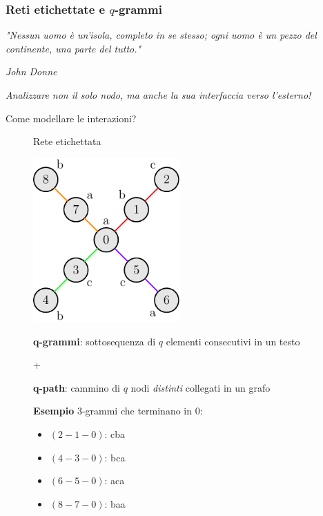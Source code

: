\begin{frame}
	\frametitle{Reti etichettate e $q$-grammi}
	
	\textit{"Nessun uomo è un'isola, completo in se stesso; ogni uomo è un pezzo del continente, una parte del tutto."}
	\begin{flushright}
		\small \textit{John Donne}
	\end{flushright}
	
	\centering
	\textit{Analizzare non il solo nodo, ma anche la sua interfaccia verso l'esterno!}\\
	
	\pause
	
	Come modellare le interazioni?\\
	
	\pause
	
	\begin{figure}[h]
		\centering
		\begin{minipage}[t]{.49\textwidth}
			\centering
			Rete etichettata\medskip
			
			\includegraphics[width=0.5\textwidth]{images/11_labeled}
		\end{minipage}\hfill
		\pause
		\begin{minipage}[t]{.49\textwidth}
			
			\centering
			
			\textbf{q-grammi}: sottosequenza di $q$ elementi consecutivi in un testo
			
			+
			
			\textbf{q-path}: cammino di $q$ nodi \textit{distinti} collegati in un grafo \bigskip
			
			\small\pause
			
			\textbf{Esempio} $3$-grammi che terminano in $0$:
			\begin{itemize}
				\item $(2-1-0)$: \color{red}cba \color{black}
				\item $(4-3-0)$: \color{green}bca \color{black}
				\item $(6-5-0)$: \color{violet}aca \color{black}
				\item $(8-7-0)$: \color{orange}baa \color{black}
			\end{itemize}
		\end{minipage}
	\end{figure}

	
\end{frame}


